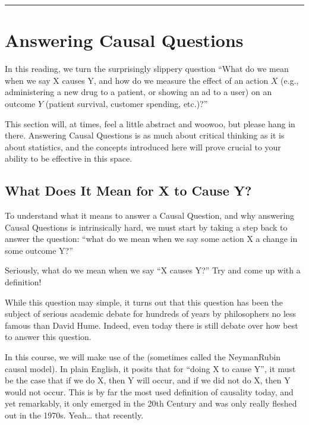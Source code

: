 \documentclass[letterpaper,10pt,english]{jupyterBook}
\begin{document}
\bigskip\hrule\bigskip


\sphinxstepscope


\section{Answering Causal Questions}
\label{\detokenize{30_questions/40_answering_causal_questions:answering-causal-questions}}\label{\detokenize{30_questions/40_answering_causal_questions::doc}}
\sphinxAtStartPar
In this reading, we turn the surprisingly slippery question “What do we mean when we say X causes Y, and how do we measure the effect of an action \(X\) (e.g., administering a new drug to a patient, or showing an ad to a user) on an outcome \(Y\) (patient survival, customer spending, etc.)?”

\sphinxAtStartPar
This section will, at times, feel a little abstract and woo\sphinxhyphen{}woo, but please hang in there. Answering Causal Questions is as much about critical thinking as it is about statistics, and the concepts introduced here will prove crucial to your ability to be effective in this space.


\subsection{What Does It Mean for X to Cause Y?}
\label{\detokenize{30_questions/40_answering_causal_questions:what-does-it-mean-for-x-to-cause-y}}
\sphinxAtStartPar
To understand what it means to answer a Causal Question, and why answering Causal Questions is intrinsically hard, we must start by taking a step back to answer the question: “what do we mean when we say some action X  a change in some outcome Y?”

\sphinxAtStartPar
Seriously, what do we mean when we say “X causes Y?” Try and come up with a definition!

\sphinxAtStartPar
While this question may  simple, it turns out that this question has been the subject of serious academic debate for hundreds of years by philosophers no less famous than David Hume. Indeed, even today there is still debate over how best to answer this question.

\sphinxAtStartPar
In this course, we will make use of the  (sometimes called the Neyman\sphinxhyphen{}Rubin causal model). In plain English, it posits that for “doing X to cause Y”, it must be the case that if we do X, then Y will occur, and if we did not do X, then Y would not occur. This is by far the most used definition of causality today, and yet remarkably, it only emerged in the 20th Century and was only really fleshed out in the 1970s. Yeah… that recently.
\end{document}
